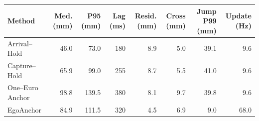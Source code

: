 \begin{tabular}{lrrrrrrr}
\toprule
Method & Med. (mm) & P95 (mm) & Lag (ms) & Resid. (mm) & Cross (mm) & Jump P99 (mm) & Update (Hz) \\
\midrule
Arrival--Hold & 46.0 & 73.0 & 180 & 8.9 & 5.0 & 39.1 & 9.6 \\
Capture--Hold & 65.9 & 99.0 & 255 & 8.7 & 5.5 & 41.0 & 9.6 \\
One--Euro Anchor & 98.8 & 139.5 & 380 & 8.1 & 9.7 & 39.8 & 9.6 \\
EgoAnchor & 84.9 & 111.5 & 320 & 4.5 & 6.9 & 9.0 & 68.0 \\
\bottomrule
\end{tabular}
